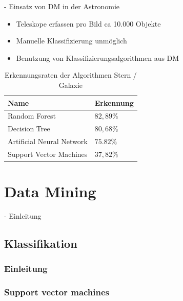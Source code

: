\documentclass[fleqn,11pt,aspectratio=43]{beamer}
\begin{document}
\begin{frame}[plain]{\insertsectionhead - Einsatz von DM in der Astronomie}
\begin{itemize}
\item Teleskope erfassen pro Bild ca 10.000 Objekte 
\item Manuelle Klassifizierung unmöglich \cite{ester2000knowledge}
\item Benutzung von Klassifizierungsalgorithmen aus DM
\end{itemize}
\pause
\begin{table}
\begin{tabular}{l|l}
Name & Erkennung\\ \hline
Random Forest & $82,89\%$ \\
Decision Tree & $80,68\%$ \\
Artificial Neural Network & $75.82\%$ \\
Support Vector Machines & $37,82\%$ \\
\end{tabular}
\caption{Erkennungsraten der Algorithmen Stern / Galaxie\cite{o2009star}}
\end{table}
\end{frame}



\section{Data Mining~}

\begin{frame}{\insertsectionhead -  Einleitung}

\end{frame}

\subsection{Klassifikation}
\subsubsection{Einleitung}
\subsubsection{Support vector machines}
\end{document}
